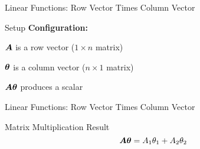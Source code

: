 \documentclass{beamer}
\begin{document}
\begin{frame}{Linear Functions: Row Vector Times Column Vector}
\begin{definitionbox}{Setup}
\textbf{Configuration:}
\cleanitemize
{
    \item $\bm{A}$ is a row vector ($1 \times n$ matrix)
    \item $\bm{\theta}$ is a column vector ($n \times 1$ matrix) 
    \item $\bm{A}\bm{\theta}$ produces a scalar
}
\end{definitionbox}

\end{frame}

\begin{frame}{Linear Functions: Row Vector Times Column Vector}
\begin{keypointsbox}{Matrix Multiplication Result}
$$\bm{A}\bm{\theta} = A_{1}\theta_{1} + A_{2}\theta_{2}$$
\end{keypointsbox}

\end{frame}
\end{document}
